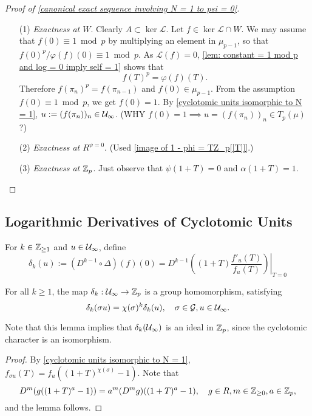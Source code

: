 \begin{proof}[Proof of \cref{canonical exact sequence involving N = 1 to psi = 0}]
\begin{enumerate}
\item [(1)] \textit{Exactness at $W$}.
Clearly $A\subset\ker\mathcal{L}$.
Let $f\in\ker\mathcal{L}\cap W$.
We may assume that $f(0)\equiv 1\bmod p$ by multiplying an element in $\mu_{p-1}$,
so that $f(0)^p/\varphi(f)(0)\equiv 1\bmod p$.
As $\mathcal{L}(f) = 0$,
\cref{lem: constant = 1 mod p and log = 0 imply self = 1} shows that \[f(T)^p = \varphi(f)(T).\]
Therefore $f(\pi_n)^p = f(\pi_{n-1})$
and $f(0)\in\mu_{p-1}$.
From the assumption $f(0)\equiv 1\bmod p$, we get
$f(0) = 1$.
By \cref{cyclotomic units isomorphic to N = 1},
$u := (f(\pi_n))_n\in\mathcal{U}_\infty$.
(WHY $f(0) = 1\implies u = (f(\pi_n))_n\in T_p(\mu)$?)




\item [(2)] \textit{Exactness at $R^{\psi = 0}$}.
(Used \cref{image of 1 - phi = TZ_p[[T]]}.)

\item [(3)] \textit{Exactness at $\mathbb{Z}_p$}.
Just observe that $\psi(1 + T) = 0$ and $\alpha(1 + T) = 1$.
\end{enumerate}
\end{proof}

\subsection{Logarithmic Derivatives of Cyclotomic Units}
For $k\in\mathbb{Z}_{\ge 1}$ and $u\in\mathcal{U}_\infty$,
define \[\delta_k(u) := 
(D^{k-1}\circ \Delta)(f)(0)
= \left.D^{k-1}\left( 
    (1 + T)\frac{f'_u(T)}{f_u(T)}
\right)\right|_{T = 0}\]
\begin{lemma}
    For all $k\ge 1$,
    the map $\delta_k : \mathcal{U}_\infty\to\mathbb{Z}_p$
    is a group homomorphism,
    satisfying \[\delta_k(\sigma u) = \chi(\sigma)^k\delta_k(u),\quad \sigma\in\mathcal{G}, u\in\mathcal{U}_\infty.\]
\end{lemma}
Note that this lemma implies that $\delta_k(\mathcal{U}_\infty)$ is an ideal in $\mathbb{Z}_p$, since the cyclotomic character is an isomorphism.\begin{proof}
    By \cref{cyclotomic units isomorphic to N = 1},
    $f_{\sigma u}(T) = f_u((1 + T)^{\chi(\sigma)} - 1)$.
    Note that \[D^m(g((1 + T)^a - 1)) = a^m(D^mg)((1 + T)^a - 1),\quad g\in R, m\in\mathbb{Z}_{\ge 0}, a\in\mathbb{Z}_p,\]
    and the lemma follows.
\end{proof}

